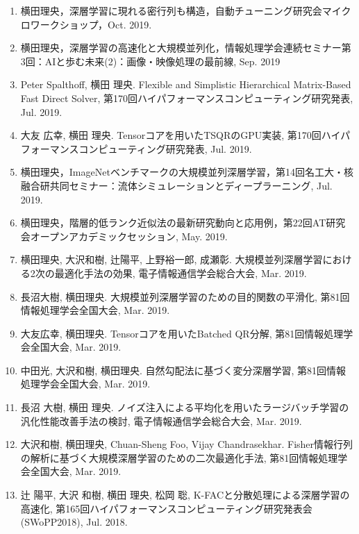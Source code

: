 \documentclass[margin,line]{cv}
\begin{document}
\begin{resume}
\begin{enumerate}
\item 横田理央，深層学習に現れる密行列も構造，自動チューニング研究会マイクロワークショップ，Oct. 2019.

\item 横田理央，深層学習の高速化と大規模並列化，情報処理学会連続セミナー第3回：AIと歩む未来(2)：画像・映像処理の最前線, Sep. 2019

\item Peter Spalthoff, 横田 理央. Flexible and Simplistic Hierarchical Matrix-Based Fast Direct Solver, 第170回ハイパフォーマンスコンピューティング研究発表, Jul. 2019.

\item 大友 広幸, 横田 理央. Tensorコアを用いたTSQRのGPU実装, 第170回ハイパフォーマンスコンピューティング研究発表, Jul. 2019.

\item 横田理央，ImageNetベンチマークの大規模並列深層学習，第14回名工大・核融合研共同セミナー：流体シミュレーションとディープラーニング, Jul. 2019.

\item 横田理央，階層的低ランク近似法の最新研究動向と応用例，第22回AT研究会オープンアカデミックセッション, May. 2019.

\item 横田理央, 大沢和樹, 辻陽平, 上野裕一郎, 成瀬彰. 大規模並列深層学習における2次の最適化手法の効果, 電子情報通信学会総合大会, Mar. 2019.

\item 長沼大樹, 横田理央. 大規模並列深層学習のための目的関数の平滑化, 第81回情報処理学会全国大会, Mar. 2019.

\item 大友広幸, 横田理央. Tensorコアを用いたBatched QR分解, 第81回情報処理学会全国大会, Mar. 2019.

\item 中田光, 大沢和樹, 横田理央. 自然勾配法に基づく変分深層学習, 第81回情報処理学会全国大会, Mar. 2019.

\item 長沼 大樹, 横田 理央. ノイズ注入による平均化を用いたラージバッチ学習の汎化性能改善手法の検討, 電子情報通信学会総合大会, Mar. 2019.

\item 大沢和樹, 横田理央, Chuan-Sheng Foo, Vijay Chandrasekhar. Fisher情報行列の解析に基づく大規模深層学習のための二次最適化手法, 第81回情報処理学会全国大会, Mar. 2019.

\item 辻 陽平, 大沢 和樹, 横田 理央, 松岡 聡, K-FACと分散処理による深層学習の高速化, 第165回ハイパフォーマンスコンピューティング研究発表会 (SWoPP2018), Jul. 2018.


\end{enumerate}
\end{resume}
\end{document}
